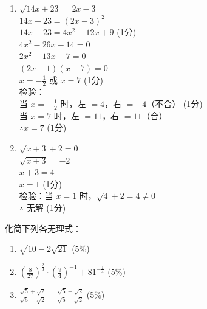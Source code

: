 \documentclass[12pt,a4paper]{exam-zh}
\begin{document}
\begin{solution}
    \begin{enumerate}[label=(\alph*)]
        \item $\sqrt{14x + 23} = 2x - 3$ \\
        $14x + 23 = (2x - 3)^2$ \\
        $14x + 23 = 4x^2 - 12x + 9$ \hfill (1分) \\
        $4x^2 - 26x - 14 = 0$ \\
        $2x^2 - 13x - 7 = 0$ \\
        $(2x + 1)(x - 7) = 0$ \\
        $x = -\frac{1}{2}$ 或 $x = 7$ \hfill (1分) \\
        检验： \\
        当 $x = -\frac{1}{2}$ 时，左 $= 4$，右 $= -4$（不合） \hfill (1分) \\
        当 $x = 7$ 时，左 $= 11$，右 $= 11$（合） \\
        $\therefore x = 7$ \hfill (1分)

        \item $\sqrt{x + 3} + 2 = 0$ \\
        $\sqrt{x + 3} = -2$ \\
        $x + 3 = 4$ \\
        $x = 1$ \hfill (1分) \\
        检验：当 $x = 1$ 时，$\sqrt{4} + 2 = 4 \neq 0$ \\
        $\therefore$ 无解 \hfill (1分)
    \end{enumerate}
\end{solution}


\begin{problem}[points = 15]
    化简下列各无理式：
    \begin{enumerate}[label=(\alph*)]
        \item $\sqrt{10 - 2\sqrt{21}}$ \hfill (5\%)
        \item $\displaystyle \left( \frac{8}{27} \right)^{\frac{2}{3}} \cdot \left( \frac{9}{4} \right)^{-1} + 81^{-\frac{1}{4}}$ \hfill (5\%)
        \item $\displaystyle \frac{\sqrt{5} + \sqrt{2}}{\sqrt{5} - \sqrt{2}} - \frac{\sqrt{5} - \sqrt{2}}{\sqrt{5} + \sqrt{2}}$ \hfill (5\%)
    \end{enumerate}
\end{problem}
\end{document}

